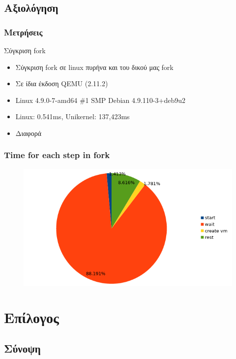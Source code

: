 \documentclass[red,slidestop,notes,compress,mathserif]{beamer}
\begin{document}
\subsection{Αξιολόγηση}
\begin{frame}
\frametitle{Μετρήσεις}
\begin{block}{Σύγκριση fork}
\begin{itemize}
\item Σύγκριση fork σε linux πυρήνα και του δικού μας fork 
\item Σε ίδια έκδοση QEMU (2.11.2)
\item Linux 4.9.0-7-amd64 \#1 SMP Debian 4.9.110-3+deb9u2
\item Linux: 0.541ms, Unikernel: 137,423ms
\item Διαφορά
\end{itemize}
\end{block}
\end{frame}

\begin{frame}
\frametitle{Time for each step in fork}
\begin{figure}
\center
\includegraphics[scale=0.8]{figures/fork_pie.png}
\end{figure}
\end{frame}

\section*{Επίλογος}

\subsection*{Σύνοψη}
\end{document}
